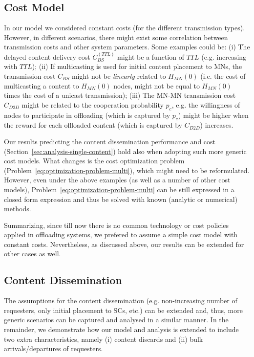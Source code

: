 \documentclass[10pt,conference,letterpaper]{IEEEtran}
\begin{document}
\subsection{Cost Model}
In our model we considered constant costs (for the different transmission types). However, in different scenarios, there might exist some correlation between transmission costs and other system parameters. Some examples could be: (i) The delayed content delivery cost $C_{BS}^{(TTL)}$ might be a function of $TTL$ (e.g. increasing with $TTL$); (ii) If multicasting is used for initial content placement to MNs, the transmission cost $C_{BS}$ might not be \textit{linearly} related to $H_{MN}(0)$ (i.e. the cost of multicasting a content to $H_{MN}(0)$ nodes, might not be equal to $H_{MN}(0)$ times the cost of a unicast transmission); (iii) The MN-MN transmission cost $C_{D2D}$ might be related to the cooperation probability $p_{c}$, e.g. the willingness of nodes to participate in offloading (which is captured by $p_{c}$) might be higher when the reward for each offloaded content (which is captured by $C_{D2D}$) increases.

Our results predicting the content dissemination performance and cost (Section~\ref{sec:analysis-single-content}) hold also when adopting such more generic cost models. What changes is the cost optimization problem (Problem~\ref{eq:optimization-problem-multi}), which might need to be reformulated. However, even under the above examples (as well as a number of other cost models), Problem~\ref{eq:optimization-problem-multi} can be still expressed in a closed form expression and thus be solved with known (analytic or numerical) methods. 

Summarizing, since till now there is no common technology or cost policies applied in offloading systems, we prefered to assume a simple cost model with constant costs. Nevertheless, as discussed above, our results can be extended for other cases as well.


\subsection{Content Dissemination}
The assumptions for the content dissemination (e.g. non-increasing number of requesters, only initial placement to SCs, etc.) can be extended and, thus, more generic scenarios can be captured and analysed in a similar manner. In the remainder, we demonstrate how our model and analysis is extended to include two extra characteristics, namely (i) content discards and (ii) bulk arrivals/departures of requesters.
\end{document}
